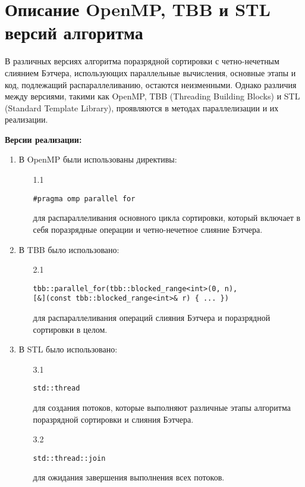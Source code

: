 \documentclass{report}
\begin{document}
\section*{Описание OpenMP, TBB и STL версий алгоритма}
\par В различных версиях алгоритма поразрядной сортировки с четно-нечетным слиянием Бэтчера, использующих параллельные вычисления, основные этапы и код, подлежащий распараллеливанию, остаются неизменными. Однако различия между версиями, такими как OpenMP, TBB (Threading Building Blocks) и STL (Standard Template Library), проявляются в методах параллелизации и их реализации.
\par \textbf{Версии реализации:}
\begin{enumerate}
\item В OpenMP были использованы директивы:
\vspace{0.5em}
\begin{enumerate}
\item[1.1] \begin{verbatim}
#pragma omp parallel for
\end{verbatim}

для распараллеливания основного цикла сортировки, который включает в себя поразрядные операции и четно-нечетное слияние Бэтчера.
\end{enumerate}
\item В TBB было использовано:
\vspace{0.5em}
\begin{enumerate}
\item[2.1] \begin{verbatim}
tbb::parallel_for(tbb::blocked_range<int>(0, n),
[&](const tbb::blocked_range<int>& r) { ... })
\end{verbatim}
для распараллеливания операций слияния Бэтчера и поразрядной сортировки в целом.
\end{enumerate}
\item В STL было использовано:
\vspace{0.5em}
\begin{enumerate}
\item[3.1] \begin{verbatim}
std::thread
\end{verbatim}
для создания потоков, которые выполняют различные этапы алгоритма поразрядной сортировки и слияния Бэтчера.
\item[3.2] \begin{verbatim}
std::thread::join
\end{verbatim}
для ожидания завершения выполнения всех потоков.
\end{enumerate}
\end{enumerate}
\end{document}
